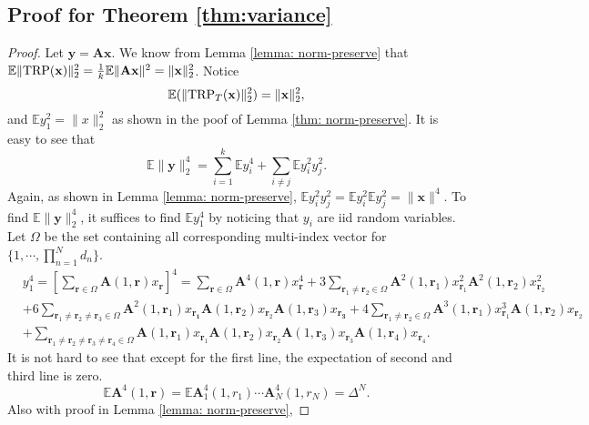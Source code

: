 \subsection*{Proof for Theorem \ref{thm:variance}}
\begin{proof}
Let $\mathbf{y}=\mathbf{Ax}$. We know from Lemma \ref{lemma: norm-preserve} that $\mathbb{E}\|\textup{TRP}(\mathbf{x})\|^2_2 = \frac{1}{k}\mathbb{E}\|\mathbf{Ax}\|^2= \|\mathbf{x}\|^2_2$. 
Notice 
\[
\mathbb{E}(\|\textup{TRP}_T(\mathbf{x})\|^2_2) = \|\mathbf{x}\|^2_2, 
\]
and $\mathbb{E} y_1^2=\|x\|_2^2$ as shown in the poof of Lemma \ref{thm: norm-preserve}. It is easy to see that
\[
\mathbb{E}\|\mathbf{y}\|^4_2 = \sum_{i=1}^k \mathbb{E} y_i^4 + \sum_{i\neq j} \mathbb{E} y_i^2y_j^2.
\]
Again, as shown in Lemma \ref{lemma: norm-preserve}, $\mathbb{E} y_i^2y_j^2 =\mathbb{E} y_i^2 \mathbb{E} y_j^2 = \|\mathbf{x}\|^4$. To find $\mathbb{E}\|\mathbf{y}\|^4_2$, it suffices to find $\mathbb{E} y_1^4$ by noticing that $y_i$ are iid random variables. Let $\Omega$ be the set containing all corresponding multi-index vector for $\{1,\cdots, \prod_{n=1}^N d_n\}$. 
\begin{equation}
\begin{aligned}
&y_1^4 = \left[\sum_{\mathbf{r}\in \Omega} \mathbf{A}(1,\mathbf{r}) x_{\mathbf{r}}\right]^4 = \sum_{\mathbf{r}\in \Omega} \mathbf{A}^4(1,\mathbf{r}) x^4_{\mathbf{r}} + 3\sum_{\mathbf{r}_1 \neq \mathbf{r}_2 \in \Omega} \mathbf{A}^2(1,\mathbf{r}_1) x^2_{\mathbf{r}_1}\mathbf{A}^2(1,\mathbf{r}_2) x^2_{\mathbf{r}_2}\\
&+6\sum_{\mathbf{r}_1 \neq \mathbf{r}_2 \neq \mathbf{r}_3 \in \Omega} \mathbf{A}^2(1,\mathbf{r}_1) x_\mathbf{\mathbf{r}_1} \mathbf{A}(1,\mathbf{r}_2)x_{\mathbf{r}_2}\mathbf{A}(1,\mathbf{r}_3)x_{\mathbf{r_3}}+4\sum_{\mathbf{r}_1 \neq \mathbf{r}_2 \in \Omega} \mathbf{A}^3(1,\mathbf{r}_1) x^3_{\mathbf{r}_1}\mathbf{A}(1,\mathbf{r}_2) x_{\mathbf{r}_2}\\
&+\sum_{\mathbf{r}_1 \neq \mathbf{r}_2 \neq \mathbf{r}_3\neq \mathbf{r}_4 \in \Omega} \mathbf{A}(1,\mathbf{r}_1) x_{\mathbf{r}_1}\mathbf{A}(1,\mathbf{r}_2) x_{\mathbf{r}_2}\mathbf{A}(1,\mathbf{r}_3) x_{\mathbf{r}_3}\mathbf{A}(1,\mathbf{r}_4) x_{\mathbf{r}_4}.\nonumber
\end{aligned}
\end{equation}
It is not hard to see that except for the first line, the expectation of second and third line is zero. 
\[
\mathbb{E} \mathbf{A}^4(1,\mathbf{r}) = \mathbb{E} \mathbf{A}^4_1 (1, r_1) \cdots \mathbf{A}^4_N(1, r_N) = \Delta^N. 
\]
Also with proof in Lemma \ref{lemma: norm-preserve}, 

\end{proof}
